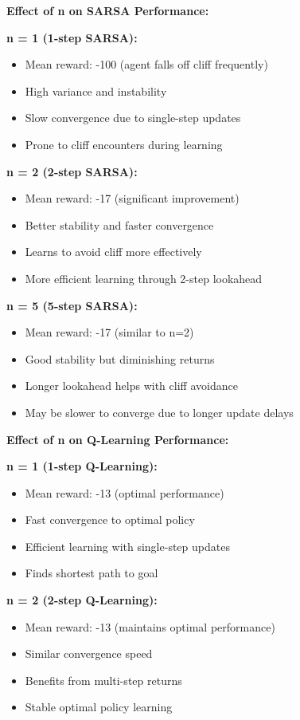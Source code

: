 \documentclass[12pt]{article}
\begin{document}
{{{\textbf{Effect of n on SARSA Performance:}

\textbf{n = 1 (1-step SARSA):}
\begin{itemize}
    \item Mean reward: -100 (agent falls off cliff frequently)
    \item High variance and instability
    \item Slow convergence due to single-step updates
    \item Prone to cliff encounters during learning
\end{itemize}

\textbf{n = 2 (2-step SARSA):}
\begin{itemize}
    \item Mean reward: -17 (significant improvement)
    \item Better stability and faster convergence
    \item Learns to avoid cliff more effectively
    \item More efficient learning through 2-step lookahead
\end{itemize}

\textbf{n = 5 (5-step SARSA):}
\begin{itemize}
    \item Mean reward: -17 (similar to n=2)
    \item Good stability but diminishing returns
    \item Longer lookahead helps with cliff avoidance
    \item May be slower to converge due to longer update delays
\end{itemize}

\textbf{Effect of n on Q-Learning Performance:}

\textbf{n = 1 (1-step Q-Learning):}
\begin{itemize}
    \item Mean reward: -13 (optimal performance)
    \item Fast convergence to optimal policy
    \item Efficient learning with single-step updates
    \item Finds shortest path to goal
\end{itemize}

\textbf{n = 2 (2-step Q-Learning):}
\begin{itemize}
    \item Mean reward: -13 (maintains optimal performance)
    \item Similar convergence speed
    \item Benefits from multi-step returns
    \item Stable optimal policy learning
\end{itemize}

}}}
\end{document}
